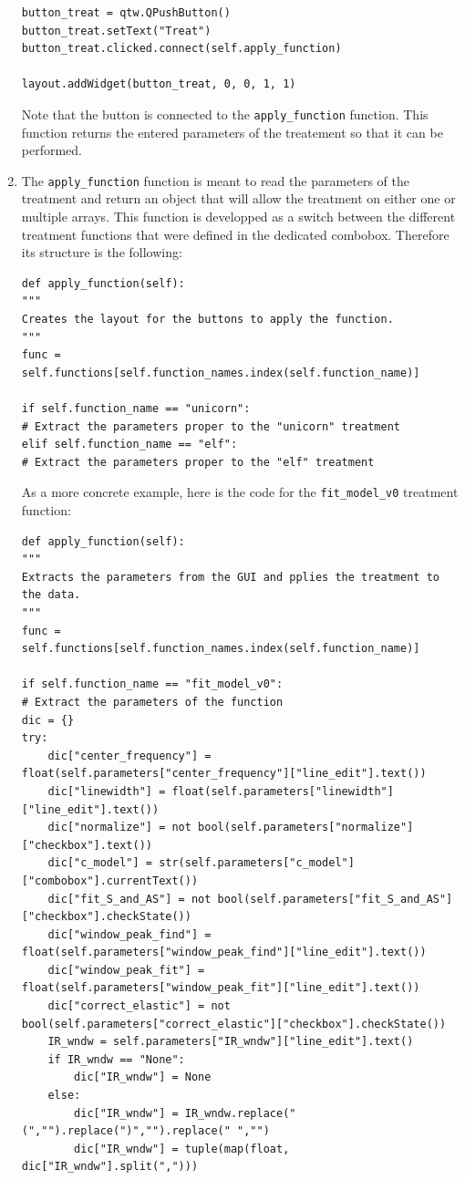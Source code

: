 \begin{enumerate}
\begin{lstlisting}
button_treat = qtw.QPushButton()
button_treat.setText("Treat")
button_treat.clicked.connect(self.apply_function)

layout.addWidget(button_treat, 0, 0, 1, 1)
\end{lstlisting}
    Note that the button is connected to the \texttt{apply\_function} function. This function returns the entered parameters of the treatement so that it can be performed.
    \item The \texttt{apply\_function} function is meant to read the parameters of the treatment and return an object that will allow the treatment on either one or multiple arrays. This function is developped as a switch between the different treatment functions that were defined in the dedicated combobox. Therefore its structure is the following:
\begin{lstlisting}
def apply_function(self):
"""
Creates the layout for the buttons to apply the function.
"""
func = self.functions[self.function_names.index(self.function_name)]

if self.function_name == "unicorn":
# Extract the parameters proper to the "unicorn" treatment
elif self.function_name == "elf":
# Extract the parameters proper to the "elf" treatment
\end{lstlisting}
    As a more concrete example, here is the code for the \texttt{fit\_model\_v0} treatment function:
\begin{lstlisting}
def apply_function(self):
"""
Extracts the parameters from the GUI and pplies the treatment to the data.
"""
func = self.functions[self.function_names.index(self.function_name)]

if self.function_name == "fit_model_v0":
# Extract the parameters of the function
dic = {}
try:
    dic["center_frequency"] = float(self.parameters["center_frequency"]["line_edit"].text())
    dic["linewidth"] = float(self.parameters["linewidth"]["line_edit"].text())
    dic["normalize"] = not bool(self.parameters["normalize"]["checkbox"].text())
    dic["c_model"] = str(self.parameters["c_model"]["combobox"].currentText())
    dic["fit_S_and_AS"] = not bool(self.parameters["fit_S_and_AS"]["checkbox"].checkState())
    dic["window_peak_find"] = float(self.parameters["window_peak_find"]["line_edit"].text()) 
    dic["window_peak_fit"] = float(self.parameters["window_peak_fit"]["line_edit"].text())
    dic["correct_elastic"] = not bool(self.parameters["correct_elastic"]["checkbox"].checkState())
    IR_wndw = self.parameters["IR_wndw"]["line_edit"].text()
    if IR_wndw == "None": 
        dic["IR_wndw"] = None
    else:
        dic["IR_wndw"] = IR_wndw.replace("(","").replace(")","").replace(" ","")
        dic["IR_wndw"] = tuple(map(float, dic["IR_wndw"].split(",")))


\end{lstlisting}
\end{enumerate}
